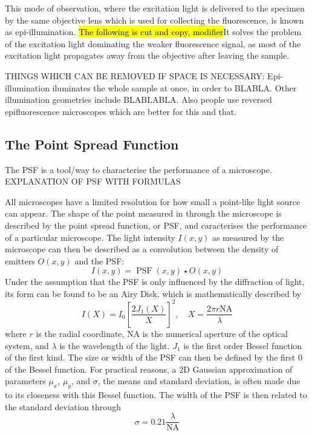 This mode of observation, where the excitation light is delivered to the specimen by the same objective lens which is used for collecting the fluorescence, 
is known as epi-illumination.
\hl{The following is cut and copy, modifier}It solves the problem of the excitation light dominating the weaker fluorescence signal, as most of the excitation light propagates away from the objective after leaving  the sample.

THINGS WHICH CAN BE REMOVED IF SPACE IS NECESSARY:
Epi-illumination iluminates the whole sample at once, in order to BLABLA. 
Other illumination geometries include BLABLABLA.
Also people use reversed epifluorescence microscopes which are better for this and that.



\subsection{The Point Spread Function}
The PSF is a tool/way to characterise the performance of a microscope.
EXPLANATION OF PSF WITH FORMULAS

All microscopes have a limited resolution for how small a point-like light source can appear. The shape of the point measured in through the microscope is described by the point spread function, or PSF, and caracterises the performance of a particular microscope. The light intensity $I(x, y)$ as measured by the microscope can then be described as a convolution between the density of emitters $O(x, y)$ and the PSF:
\begin{equation}
    I(x, y) = \operatorname{PSF}(x, y) \star O(x, y)
\end{equation}
Under the assumption that the PSF is only influenced by the diffraction of light, its form can be found to be an Airy Disk, which is mathematically described by
\begin{equation}
    I(X) = I_0 \left[ \frac{2 J_1(X)}{X} \right]^{2}, \quad X = \frac{2\pi r \textrm{NA}}{\lambda}
\end{equation}
where $r$ is the radial coordinate, NA is the numerical aperture of the optical system, and $\lambda$ is the wavelength of the light. $J_1$ is the first order Bessel function of the first kind. The size or width of the PSF can then be defined by the first $0$ of the Bessel function.
For practical reasons, a 2D Gaussian approximation of parameters $\mu_x$, $\mu_y$, and $\sigma$, the means and standard deviation, is often made due to its closeness with this Bessel function. The width of the PSF is then related to the standard deviation through
\begin{equation}
    \sigma = 0.21 \frac{\lambda}{\textrm{NA}}
    \label{eq:PSF_width_gaussian}
\end{equation}


